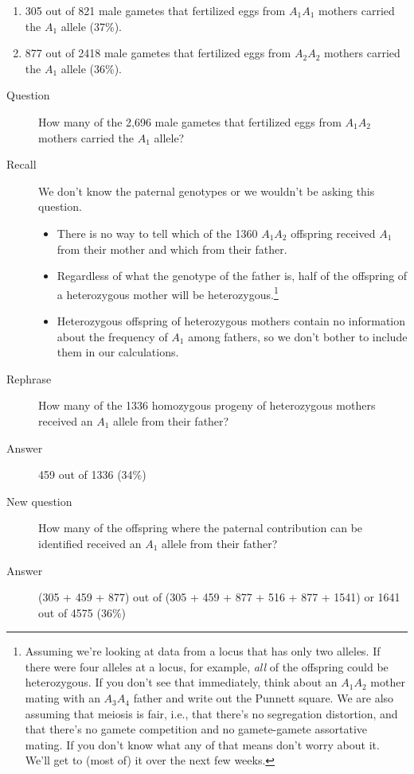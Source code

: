 \documentclass[12pt]{article}
\begin{document}
\begin{enumerate}

\item 305 out of 821 male gametes that fertilized eggs from $A_1A_1$
mothers carried the $A_1$ allele (37\%).

\item 877 out of 2418 male gametes that fertilized eggs from $A_2A_2$
mothers carried the $A_1$ allele (36\%).

\end{enumerate}

\begin{description}

\item[Question] How many of the 2,696 male gametes that fertilized
eggs from $A_1A_2$ mothers carried the $A_1$ allele?

\item[Recall] We don't know the paternal genotypes or we wouldn't be
asking this question.

\begin{itemize}

\item There is no way to tell which of the 1360 $A_1A_2$ offspring
  received $A_1$ from their mother and which from their father.

\item Regardless of what the genotype of the father is, half of the
  offspring of a heterozygous mother will be
  heterozygous.\footnote{Assuming we're looking at data from a locus
    that has only two alleles. If there were four alleles at a locus,
    for example, {\it all\/} of the offspring could be
    heterozygous. If you don't see that immediately, think about an
    $A_1A_2$ mother mating with an $A_3A_4$ father and write out the
    Punnett square. We are also assuming that meiosis is fair, i.e.,
    that there's no segregation distortion, and that there's no gamete
    competition and no gamete-gamete assortative mating. If you don't
    know what any of that means don't worry about it. We'll get to
    (most of) it over the next few weeks.}

\item Heterozygous offspring of heterozygous mothers contain no
information about the frequency of $A_1$ among fathers, so we don't
bother to include them in our calculations.

\end{itemize}

\item[Rephrase] How many of the 1336 homozygous progeny of
heterozygous mothers received an $A_1$ allele from their father?

\item[Answer] 459 out of 1336 (34\%)

\item[New question] How many of the offspring where the paternal
contribution can be identified received an $A_1$ allele from their
father?

\item[Answer] (305 + 459 + 877) out of (305 + 459 + 877 + 516 + 877 +
1541) or 1641 out of 4575 (36\%)

\end{description}
\end{document}
